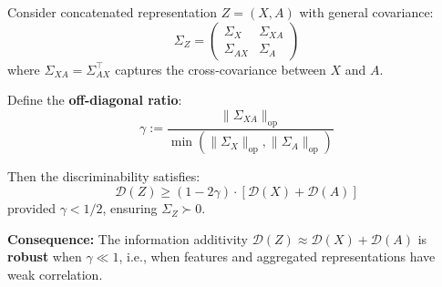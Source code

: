 \begin{theorem}
\label{thm:concat_stability}
Consider concatenated representation $Z = (X, A)$ with general covariance:
\begin{equation}
    \Sigma_Z = \begin{pmatrix} \Sigma_X & \Sigma_{XA} \\ \Sigma_{AX} & \Sigma_A \end{pmatrix}
\end{equation}
where $\Sigma_{XA} = \Sigma_{AX}^\top$ captures the cross-covariance between $X$ and $A$.

Define the \textbf{off-diagonal ratio}:
\begin{equation}
    \gamma := \frac{\|\Sigma_{XA}\|_{\mathrm{op}}}{\min(\|\Sigma_X\|_{\mathrm{op}}, \|\Sigma_A\|_{\mathrm{op}})}
\end{equation}

Then the discriminability satisfies:
\begin{equation}
    \mathcal{D}(Z) \geq (1 - 2\gamma) \cdot [\mathcal{D}(X) + \mathcal{D}(A)]
\end{equation}
provided $\gamma < 1/2$, ensuring $\Sigma_Z \succ 0$.

\textbf{Consequence:} The information additivity $\mathcal{D}(Z) \approx \mathcal{D}(X) + \mathcal{D}(A)$ is \textbf{robust} when $\gamma \ll 1$, i.e., when features and aggregated representations have weak correlation.
\end{theorem}

